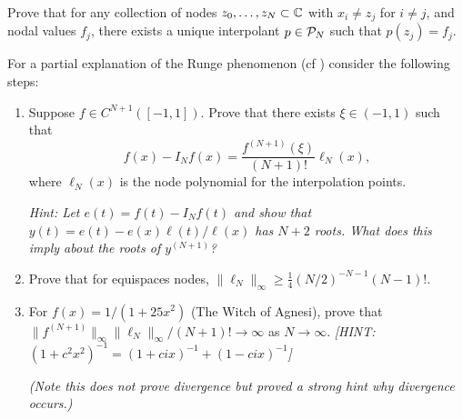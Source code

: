 


   

\begin{exercise} Prove that for any
   collection of nodes $z_0, \dots, z_N \subset \mathbb{C}$ with $x_i \neq z_j$  for $i
   \neq j$, and nodal values $f_j$, there exists a unique interpolant $p \in
   \mathcal{P}_N$ such that $p(z_j) = f_j$. 
\end{exercise}

\begin{exercise}
   \label{exr:poly:Runge Phenomenon}
   For a partial explanation of the Runge phenomenon (cf \nbpoly) consider 
   the following steps: 
   \begin{enumerate} \ilist 
      \item Suppose $f \in C^{N+1}([-1,1])$. Prove that there exists 
      $\xi \in (-1,1)$ such that 
      \[
         f(x) - I_N f(x) =  \frac{f^{(N+1)}(\xi)}{(N+1)!} 
            \ell_N(x),
      \]
      where $\ell_N(x)$ is the node polynomial for the interpolation points. 

      {\it Hint: Let $e(t) = f(t)-I_N f(t)$ and show that $y(t) = e(t) - e(x)
      \ell(t) / \ell(x)$ has $N+2$ roots. What does this imply about the roots
      of $y^{(N+1)}$?}

      \item Prove that for equispaces nodes, $\|\ell_N\|_\infty \geq \frac14
      (N/2)^{-N-1} (N-1)!$.

      \item For $f(x) = 1 / (1+25 x^2)$ (The Witch of Agnesi), prove that $\|
       f^{(N+1)} \|_\infty \| \ell_N \|_\infty  / (N+1)! \to \infty$ as $N \to
       \infty$. {\it [HINT: $(1+c^2x^2)^{-1} = (1+cix)^{-1}+(1-cix)^{-1}$]}

       {\it (Note this does not prove divergence but proved a strong 
       hint why divergence occurs.)}
   \end{enumerate}
\end{exercise}


